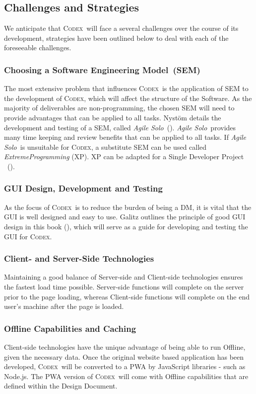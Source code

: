 \documentclass[review]{cmpreport}
\newcommand{\sem}{Software Engineering Model}
\newcommand{\Codex}{\textsc{Codex}}
\newcommand{\AgileSolo}{\emph{Agile Solo}}
\begin{document}
	\subsection{Challenges and Strategies}
	We anticipate that \Codex \ will face a several challenges over the course of its development, strategies have been outlined below to deal with each of the foreseeable challenges.	

	\subsubsection{Choosing a \sem \ (SEM)} 
	The most extensive problem that influences \Codex \ is the application of SEM to the development of \Codex, which will affect the structure of the Software. As the majority of deliverables are non-programming, the chosen SEM will need to provide advantages that can be applied to all tasks. Nyst{\"o}m details the development and testing of a SEM, called \AgileSolo \ (\cite{AgileSolo}). \AgileSolo \ provides many time keeping and review benefits that can be applied to all tasks. If \AgileSolo \ is unsuitable for \Codex, a substitute SEM can be used called \emph{ExtremeProgramming} (XP). XP can be adapted for a Single Developer Project \ (\cite{SoloXP}).
	
	\subsubsection{GUI Design, Development and Testing}
	As the focus of \Codex \ is to reduce the burden of being a DM, it is vital that the GUI is well designed and easy to use. Galitz outlines the principle of good GUI design in this book (\cite{GUIDesign}), which will serve as a guide for developing and testing the GUI for \Codex.
	
	\subsubsection{Client- and Server-Side Technologies}
	Maintaining a good balance of Server-side and Client-side technologies ensures the fastest load time possible. Server-side functions will complete on the server prior to the page loading, whereas Client-side functions will complete on the end user's machine after the page is loaded.
	
	\subsubsection{Offline Capabilities and Caching}
	Client-side technologies have the unique advantage of being able to run Offline, given the necessary data. Once the original website based application has been developed, \Codex \ will be converted to a PWA by JavaScript libraries - such as Node.js. The PWA version of \Codex \ will come with Offline capabilities that are defined within the Design Document.
	
\end{document}
